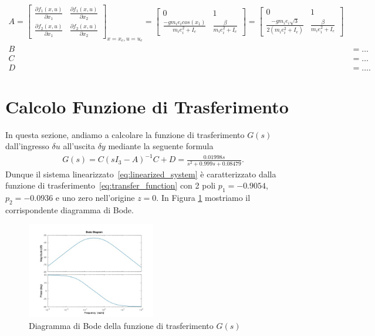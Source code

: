 \documentclass[a4paper, 11pt]{article}
\begin{document}
\begin{subequations}\label{eq:matrices}
\begin{align}
	A = \begin{bmatrix}
	    \frac{\partial f_1(x,u)}{\partial x_1} & \frac{\partial f_1(x,u)}{\partial x_2} 
        \\ 
        \frac{\partial f_2(x,u)}{\partial x_1} & \frac{\partial f_2(x,u)}{\partial x_2} 
        \end{bmatrix}_{{\scriptscriptstyle x=x_e}, {\scriptscriptstyle u = u_e}}
        = \begin{bmatrix}
            0 & 1 
            \\ 
            \frac{-g m_i e_i cos(x_1)}{m_i e_i^2 + I_e} & \frac{\beta}{m_i e_i^2 + I_e}
        \end{bmatrix} 
        = \begin{bmatrix}
            0 & 1 
            \\ 
            \frac{-g m_i e_i \sqrt{3}}{2(m_i e_i^2 + I_e)} & \frac{\beta}{m_i e_i^2 + I_e}
        \end{bmatrix}
	\\
	B &= \dots
	\\
	C &= \dots
	\\
	D &= \dots.
\end{align}
\end{subequations}
%
\section{Calcolo Funzione di Trasferimento}

In questa sezione, andiamo a calcolare la funzione di trasferimento $G(s)$ dall'ingresso $\delta u$ all'uscita $\delta y$ mediante la seguente formula 
%
%
\begin{align}\label{eq:transfer_function}
G(s) = C(sI_3 - A)^{-1}C +D = \frac{0.01998 s}{s^2 + 0.999 s + 0.08479}.
\end{align}
%
Dunque il sistema linearizzato~\eqref{eq:linearized_system} è caratterizzato dalla funzione di trasferimento~\eqref{eq:transfer_function} con 2 poli $p_1 = -0.9054$, $p_2 = -0.0936$ e uno zero nell'origine $z = 0$. In Figura \ref{fig:bode1} mostriamo il corrispondente diagramma di Bode. 

\begin{figure}[h]
\centering
\includegraphics[width=0.5\textwidth]{fig_bode_G(s).jpg}
\caption{Diagramma di Bode della funzione di trasferimento $G(s)$}
\label{fig:bode1}
\end{figure}
\end{document}
